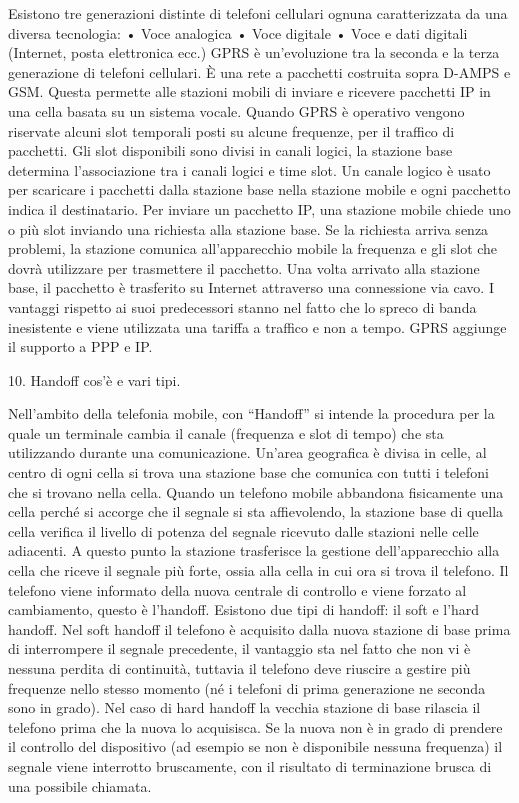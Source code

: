 Esistono tre generazioni distinte di telefoni cellulari ognuna caratterizzata da una diversa tecnologia:
•	Voce analogica
•	Voce digitale
•	Voce e dati digitali (Internet, posta elettronica ecc.)
GPRS è un’evoluzione tra la seconda e la terza generazione di telefoni cellulari. È una rete a pacchetti costruita sopra D-AMPS e GSM. Questa permette alle stazioni mobili di inviare e ricevere pacchetti IP in una cella basata su un sistema vocale. Quando GPRS è operativo vengono riservate alcuni slot temporali posti su alcune frequenze, per il traffico di pacchetti.
Gli slot disponibili sono divisi in canali logici, la stazione base determina l’associazione tra i canali logici e time slot. Un canale logico è usato per scaricare i pacchetti dalla stazione base nella stazione mobile e ogni pacchetto indica il destinatario.
Per inviare un pacchetto IP, una stazione mobile chiede uno o più slot inviando una richiesta alla stazione base. Se la richiesta arriva senza problemi, la stazione comunica all’apparecchio mobile la frequenza e gli slot che dovrà utilizzare per trasmettere il pacchetto. Una volta arrivato alla stazione base, il pacchetto è trasferito su Internet attraverso una connessione via cavo.
I vantaggi rispetto ai suoi predecessori stanno nel fatto che lo spreco di banda inesistente e viene utilizzata una tariffa a traffico e non a tempo. GPRS aggiunge il supporto a PPP e IP.

10.	Handoff cos’è e vari tipi.

Nell’ambito della telefonia mobile, con “Handoff” si intende la procedura per la quale un terminale cambia il canale (frequenza e slot di tempo) che sta utilizzando durante una comunicazione.
Un’area geografica è divisa in celle, al centro di ogni cella si trova una stazione base che comunica con tutti i telefoni che si trovano nella cella.
Quando un telefono mobile abbandona fisicamente una cella perché si accorge che il segnale si sta affievolendo, la stazione base di quella cella verifica il livello di potenza del segnale ricevuto dalle stazioni nelle celle adiacenti. A questo punto la stazione trasferisce la gestione dell’apparecchio alla cella che riceve il segnale più forte, ossia alla cella in cui ora si trova il telefono.
Il telefono viene informato della nuova centrale di controllo e viene forzato al cambiamento, questo è l’handoff.
Esistono due tipi di handoff: il soft e l’hard handoff. Nel soft handoff il telefono è acquisito dalla nuova stazione di base prima di interrompere il segnale precedente, il vantaggio sta nel fatto che non vi è nessuna perdita di continuità, tuttavia il telefono deve riuscire a gestire più frequenze nello stesso momento (né i telefoni di prima generazione ne seconda sono in grado).
Nel caso di hard handoff la vecchia stazione di base rilascia il telefono prima che la nuova lo acquisisca. Se la nuova non è in grado di prendere il controllo del dispositivo (ad esempio se non è disponibile nessuna frequenza) il segnale viene interrotto bruscamente, con il risultato di terminazione brusca di una possibile chiamata.


